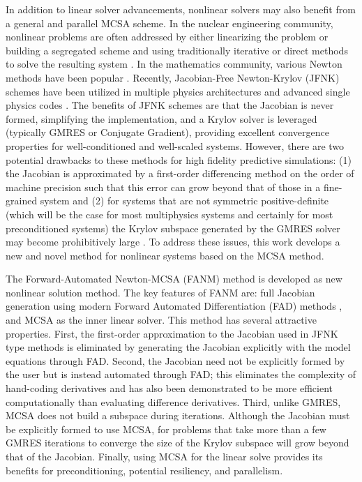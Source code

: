 In addition to linear solver advancements, nonlinear solvers may also
benefit from a general and parallel MCSA scheme. In the nuclear
engineering community, nonlinear problems are often addressed by
either linearizing the problem or building a segregated scheme and
using traditionally iterative or direct methods to solve the resulting
system \citep{pletcher_computational_1997}. In the mathematics
community, various Newton methods have been popular
\citep{kelley_iterative_1995}. Recently, Jacobian-Free Newton-Krylov
(JFNK) schemes \citep{knoll_jacobian-free_2004} have been utilized in
multiple physics architectures and advanced single physics codes
\citep{gaston_parallel_2009}. The benefits of JFNK schemes are that
the Jacobian is never formed, simplifying the implementation, and a
Krylov solver is leveraged (typically GMRES or Conjugate Gradient),
providing excellent convergence properties for well-conditioned and
well-scaled systems. However, there are two potential drawbacks to
these methods for high fidelity predictive simulations: (1) the
Jacobian is approximated by a first-order differencing method on the
order of machine precision such that this error can grow beyond that
of those in a fine-grained system \citep{kelley_iterative_1995} and
(2) for systems that are not symmetric positive-definite (which will
be the case for most multiphysics systems and certainly for most
preconditioned systems) the Krylov subspace generated by the GMRES
solver may become prohibitively large
\citep{knoll_newton-krylov_1995}. To address these issues, this work
develops a new and novel method for nonlinear systems based on the
MCSA method.

The Forward-Automated Newton-MCSA (FANM) method is developed as new
nonlinear solution method. The key features of FANM are: full Jacobian
generation using modern Forward Automated Differentiation (FAD)
methods \citep{bartlett_automatic_2006}, and MCSA as the inner linear
solver. This method has several attractive properties. First, the
first-order approximation to the Jacobian used in JFNK type methods is
eliminated by generating the Jacobian explicitly with the model
equations through FAD. Second, the Jacobian need not be explicitly
formed by the user but is instead automated through FAD; this
eliminates the complexity of hand-coding derivatives and has also been
demonstrated to be more efficient computationally than evaluating
difference derivatives. Third, unlike GMRES, MCSA does not build a
subspace during iterations. Although the Jacobian must be explicitly
formed to use MCSA, for problems that take more than a few GMRES
iterations to converge the size of the Krylov subspace will grow
beyond that of the Jacobian. Finally, using MCSA for the linear solve
provides its benefits for preconditioning, potential resiliency, and
parallelism.

